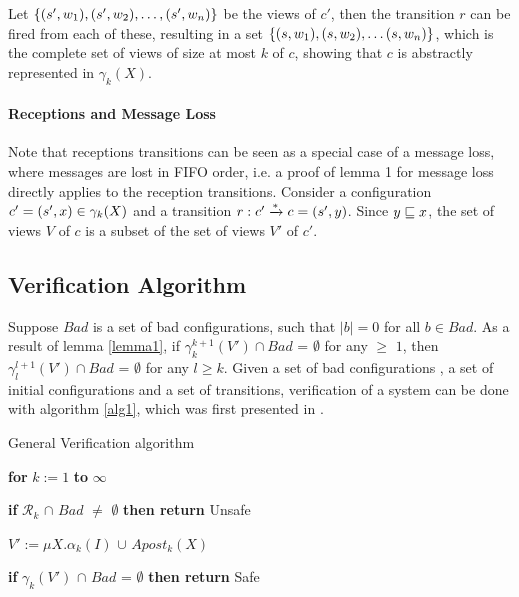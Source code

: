 Let $\{(s', w_1), (s', w_2), \ldots,  (s', w_n)\}$ be the views of $c'$, then the transition $r$ can be fired from each of these, resulting in a set $\{(s, w_1), (s, w_2),\ldots (s, w_n)\}$, which is the complete set of views of size at most $k$ of $c$, showing that $c$ is abstractly represented in $\gamma_k(X)$.

\paragraph{Receptions and Message Loss}
Note that receptions transitions can be seen as a special case of a message loss, where messages are lost in FIFO order, i.e. a proof of lemma 1 for message loss directly applies to the reception transitions. Consider a configuration $c' = (s', x) \in \gamma_k(X)$ and a transition $r: c' \xrightarrow{*} c = (s', y)$. Since $y \sqsubseteq x$, the set of views $V$ of $c$ is a subset of the set of views $V'$ of $c'$.

\subsection{Verification Algorithm}
\label{verificationalgorithm}
Suppose $Bad$ is a set of bad configurations, such that $|b| = 0$ for all $b \in Bad$. As a result of lemma \ref{lemma1}, if $\gamma_k^{k+1}(V') \cap Bad$ = $\emptyset$ for any  $\geq$ $1$, then $\gamma_l^{l+1}(V') \cap Bad$ = $\emptyset$ for any $l \geq k$. Given a set of bad configurations , a set of initial configurations  and a set of transitions, verification of a system can be done with algorithm \ref{alg1}, which was first presented in \cite{parosh}.

\begin{algorithm}
\begin{algorithmic}[1]
  \caption{General Verification algorithm}
  \label{alg1}
    \State \hspace{8pt}\textbf{for} $k := 1$ \textbf{to} $\infty$

    \State \hspace{16pt}\textbf{if} $\mathcal{R}_k$ $\cap$ $Bad$ $\neq$ $\emptyset$ \textbf{then return} Unsafe

    \State \hspace{16pt}$V' := \mu X.\alpha_k(I)$ $\cup$ $Apost_k(X)$

    \State \hspace{16pt}\textbf{if} {$\gamma_k(V')$ $\cap$ $Bad$ = $\emptyset$} \textbf{then return} Safe
\end{algorithmic}
\end{algorithm}

